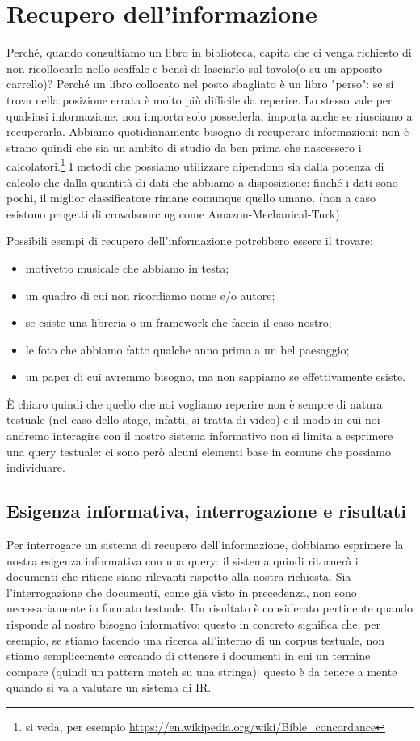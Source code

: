 \chapter{Recupero dell'informazione}
\label{cap:recupero-informazione}
Perché, quando consultiamo un libro in biblioteca, capita che ci venga richiesto di non ricollocarlo nello scaffale e bensì di lasciarlo sul tavolo(o su un apposito carrello)? Perché un libro collocato nel posto sbagliato è un libro "perso": se si trova nella posizione errata è molto più difficile da reperire. Lo stesso vale per qualsiasi informazione: non importa solo possederla, importa anche se riusciamo a recuperarla.
Abbiamo quotidianamente bisogno di recuperare informazioni: non è strano quindi che sia un ambito di studio da ben prima che nascessero i calcolatori.\footnote{si veda, per esempio \url{https://en.wikipedia.org/wiki/Bible_concordance}} I metodi che possiamo utilizzare dipendono sia dalla potenza di calcolo che dalla quantità di dati che abbiamo a disposizione: finché i dati sono pochi, il miglior classificatore rimane comunque quello umano. (non a caso esistono progetti di crowdsourcing come \gls{Amazon-Mechanical-Turk})

Possibili esempi di recupero dell'informazione potrebbero essere il trovare: 
\begin{itemize}
\item motivetto musicale che abbiamo in testa;
\item un quadro di cui non ricordiamo nome e/o autore;
\item se esiste una libreria o un framework che faccia il caso nostro;
\item le foto che abbiamo fatto qualche anno prima a un bel paesaggio;
\item un paper di cui avremmo bisogno, ma non sappiamo se effettivamente esiste.
\end{itemize}

È chiaro quindi che quello che noi vogliamo reperire non è sempre di natura testuale (nel caso dello stage, infatti, si tratta di video) e il modo in cui noi andremo interagire con il nostro sistema informativo non si limita a esprimere una query testuale: ci sono però alcuni elementi base in comune che possiamo individuare.

\section{Esigenza informativa, interrogazione e risultati}
Per interrogare un sistema di recupero dell'informazione, dobbiamo esprimere la nostra esigenza informativa con una query: il sistema quindi ritornerà i documenti che ritiene siano rilevanti rispetto alla nostra richiesta. Sia l'interrogazione che documenti, come già visto in precedenza, non sono necessariamente in formato testuale. Un risultato è considerato pertinente quando risponde al nostro bisogno informativo: questo in concreto significa che, per esempio, se stiamo facendo una ricerca all’interno di un corpus testuale, non stiamo semplicemente cercando di ottenere i documenti in cui un termine compare (quindi un pattern match su una stringa): questo è da tenere a mente quando si va a valutare un sistema di IR.

